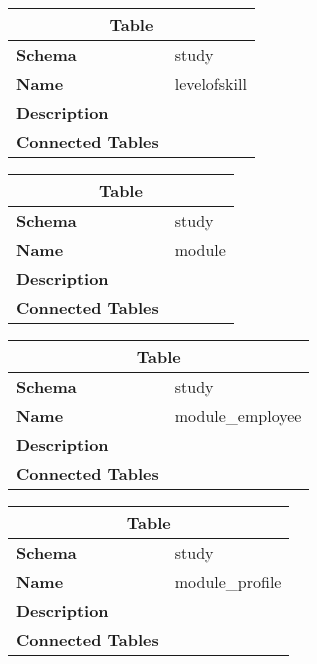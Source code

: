 \begin{table}[H]
	\renewcommand{\arraystretch}{2}
	\centering
	\begin{tabular}{|p{}|p{}|}
		\hline
		\multicolumn{2}{|c|}{\textbf{Table}} \\ \hline
		\textbf{Schema}               & study \\ \hline
		\textbf{Name}                 & levelofskill \\ \hline
		\textbf{Description}          &      \\ \hline
		\textbf{Connected Tables}     &      \\ \hline
	\end{tabular}
\end{table}

\begin{table}[H]
	\renewcommand{\arraystretch}{2}
	\centering
	\begin{tabular}{|p{}|p{}|}
		\hline
		\multicolumn{2}{|c|}{\textbf{Table}} \\ \hline
		\textbf{Schema}               & study \\ \hline
		\textbf{Name}                 & module \\ \hline
		\textbf{Description}          &      \\ \hline
		\textbf{Connected Tables}     &      \\ \hline
	\end{tabular}
\end{table}

\begin{table}[H]
	\renewcommand{\arraystretch}{2}
	\centering
	\begin{tabular}{|p{}|p{}|}
		\hline
		\multicolumn{2}{|c|}{\textbf{Table}} \\ \hline
		\textbf{Schema}               & study \\ \hline
		\textbf{Name}                 & module\_employee \\ \hline
		\textbf{Description}          &      \\ \hline
		\textbf{Connected Tables}     &      \\ \hline
	\end{tabular}
\end{table}

\begin{table}[H]
	\renewcommand{\arraystretch}{2}
	\centering
	\begin{tabular}{|p{}|p{}|}
		\hline
		\multicolumn{2}{|c|}{\textbf{Table}} \\ \hline
		\textbf{Schema}               & study \\ \hline
		\textbf{Name}                 & module\_profile \\ \hline
		\textbf{Description}          &      \\ \hline
		\textbf{Connected Tables}     &      \\ \hline
	\end{tabular}
\end{table}

